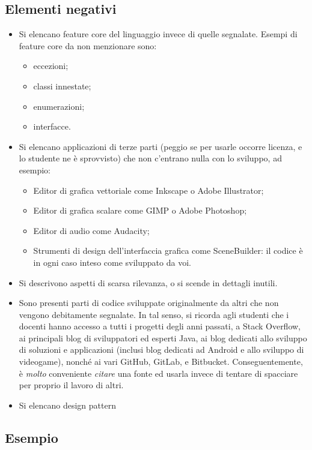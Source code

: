 \documentclass[a4paper,12pt]{report}
\begin{document}
\begin{itemize}
\subsection*{Elementi negativi}
\begin{itemize}
	\item Si elencano feature core del linguaggio invece di quelle segnalate. Esempi di feature core da non menzionare sono:
    \begin{itemize}
        \item eccezioni;
        \item classi innestate;
        \item enumerazioni;
        \item interfacce.
    \end{itemize}
	\item Si elencano applicazioni di terze parti (peggio se per usarle occorre licenza, e lo studente ne è sprovvisto) che non c'entrano nulla con lo sviluppo, ad esempio:
    \begin{itemize}
        \item Editor di grafica vettoriale come Inkscape o Adobe Illustrator;
        \item Editor di grafica scalare come GIMP o Adobe Photoshop;
        \item Editor di audio come Audacity;
        \item Strumenti di design dell'interfaccia grafica come SceneBuilder: il codice è in ogni caso inteso come sviluppato da voi.
    \end{itemize}
	\item Si descrivono aspetti di scarsa rilevanza, o si scende in dettagli inutili.
	\item Sono presenti parti di codice sviluppate originalmente da altri che non vengono debitamente segnalate.
	In tal senso, si ricorda agli studenti che i docenti hanno accesso a tutti i progetti degli anni passati,
	a Stack Overflow,
	ai principali blog di sviluppatori ed esperti Java,
	ai blog dedicati allo sviluppo di soluzioni e applicazioni
	(inclusi blog dedicati ad Android e allo sviluppo di videogame),
	nonché ai vari GitHub, GitLab, e Bitbucket.
	Conseguentemente, è \emph{molto} conveniente \emph{citare} una fonte ed usarla invece di tentare di spacciare per proprio il lavoro di altri.
	\item Si elencano design pattern
\end{itemize}

\subsection{Esempio}


\end{itemize}
\end{document}

